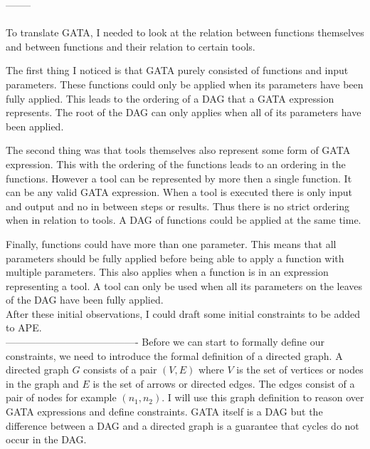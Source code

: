 
--------\\
\\
To translate GATA, I needed to look at the relation between functions themselves and between functions and their relation to certain tools. 

The first thing I noticed is that GATA purely consisted of functions and input parameters. These functions could only be applied when its parameters have been fully applied.  This leads to the ordering of a DAG that a GATA expression represents. The root of the DAG can only applies when all of its parameters have been applied. 

The second thing was that tools themselves also represent some form of GATA expression. This with the ordering of the functions leads to an ordering in the functions. However a tool can be represented by more then a single function. It can be any valid GATA expression. When a tool is executed there is only input and output and no in between steps or results. Thus there is no strict ordering when in relation to tools. A DAG of functions could be applied at the same time. 

Finally, functions could have more than one parameter. This means that all parameters should be fully applied before being able to apply a function with multiple parameters. This also applies when a function is in an expression representing a tool. A tool can only be used when all its parameters on the leaves of the DAG have been fully applied. 
\\

After these initial observations, I could draft some initial constraints to be added to APE. 
\\
% 
----------------------------------------
Before we can start to formally define our constraints, we need to introduce the formal definition of a directed graph. A directed graph $G$ consists of a pair $(V, E)$ where $V$ is the set of vertices or nodes in the graph and $E$ is the set of arrows or directed edges. The edges consist of a pair of nodes for example $(n_1, n_2)$. I will use this graph definition to reason over GATA expressions and define constraints. GATA itself is a DAG but the difference between a DAG and a directed graph is a guarantee that cycles do not occur in the DAG. 

